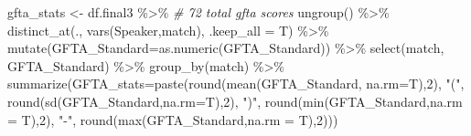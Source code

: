 \documentclass[
]{article}
\newenvironment{Shaded}{\begin{snugshade}}{\end{snugshade}}
\newcommand{\AttributeTok}[1]{\textcolor[rgb]{0.77,0.63,0.00}{#1}}
\newcommand{\CommentTok}[1]{\textcolor[rgb]{0.56,0.35,0.01}{\textit{#1}}}
\newcommand{\DecValTok}[1]{\textcolor[rgb]{0.00,0.00,0.81}{#1}}
\newcommand{\FunctionTok}[1]{\textcolor[rgb]{0.00,0.00,0.00}{#1}}
\newcommand{\NormalTok}[1]{#1}
\newcommand{\OtherTok}[1]{\textcolor[rgb]{0.56,0.35,0.01}{#1}}
\newcommand{\SpecialCharTok}[1]{\textcolor[rgb]{0.00,0.00,0.00}{#1}}
\newcommand{\StringTok}[1]{\textcolor[rgb]{0.31,0.60,0.02}{#1}}
\begin{document}
\begin{Shaded}
\begin{Highlighting}[]
\NormalTok{gfta\_stats }\OtherTok{\textless{}{-}}\NormalTok{ df.final3 }\SpecialCharTok{\%\textgreater{}\%} \CommentTok{\# 72 total gfta scores }
  \FunctionTok{ungroup}\NormalTok{() }\SpecialCharTok{\%\textgreater{}\%}
  \FunctionTok{distinct\_at}\NormalTok{(., }\FunctionTok{vars}\NormalTok{(Speaker,match), }\AttributeTok{.keep\_all =}\NormalTok{ T) }\SpecialCharTok{\%\textgreater{}\%}
  \FunctionTok{mutate}\NormalTok{(}\AttributeTok{GFTA\_Standard=}\FunctionTok{as.numeric}\NormalTok{(GFTA\_Standard)) }\SpecialCharTok{\%\textgreater{}\%}
  \FunctionTok{select}\NormalTok{(match, GFTA\_Standard) }\SpecialCharTok{\%\textgreater{}\%}
  \FunctionTok{group\_by}\NormalTok{(match) }\SpecialCharTok{\%\textgreater{}\%}
  \FunctionTok{summarize}\NormalTok{(}\AttributeTok{GFTA\_stats=}\FunctionTok{paste}\NormalTok{(}\FunctionTok{round}\NormalTok{(}\FunctionTok{mean}\NormalTok{(GFTA\_Standard, }\AttributeTok{na.rm=}\NormalTok{T),}\DecValTok{2}\NormalTok{),}
                                \StringTok{"("}\NormalTok{,}
                                \FunctionTok{round}\NormalTok{(}\FunctionTok{sd}\NormalTok{(GFTA\_Standard,}\AttributeTok{na.rm=}\NormalTok{T),}\DecValTok{2}\NormalTok{),}
                                \StringTok{")"}\NormalTok{,}
                                \FunctionTok{round}\NormalTok{(}\FunctionTok{min}\NormalTok{(GFTA\_Standard,}\AttributeTok{na.rm =}\NormalTok{ T),}\DecValTok{2}\NormalTok{),}
                                \StringTok{"{-}"}\NormalTok{,}
                                \FunctionTok{round}\NormalTok{(}\FunctionTok{max}\NormalTok{(GFTA\_Standard,}\AttributeTok{na.rm =}\NormalTok{ T),}\DecValTok{2}\NormalTok{)))}



\end{Highlighting}
\end{Shaded}
\end{document}
